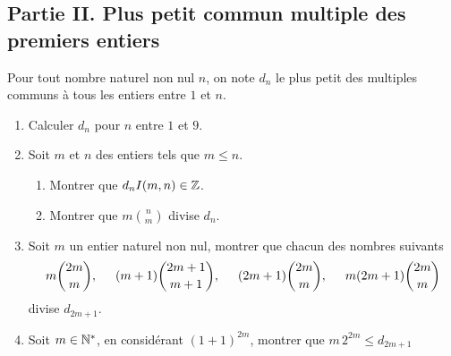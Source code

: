 \subsection*{Partie II. Plus petit commun multiple des premiers entiers}
Pour tout nombre naturel non nul $n$, on note $d_n$ le plus petit des multiples communs à tous les entiers entre $1$ et $n$.
\begin{enumerate}
 \item Calculer $d_n$ pour $n$ entre $1$ et $9$.
 \item Soit $m$ et $n$ des entiers tels que  $m\leq n$.
\begin{enumerate}
 \item Montrer que $d_nI(m,n)\in\mathbb{Z}$.
 \item Montrer que $m\binom{n}{m}$ divise $d_n$.
\end{enumerate}
\item Soit $m$ un entier naturel non nul, montrer que chacun des nombres suivants
\begin{displaymath}
 m\binom{2m}{m},\hspace{0.5cm}(m+1)\binom{2m+1}{m+1},\hspace{0.5cm}
 (2m+1)\binom{2m}{m},\hspace{0.5cm}m(2m+1)\binom{2m}{m}
\end{displaymath}
divise $d_{2m+1}$.
\item Soit $m\in \mathbb{N}^*$, en considérant $(1+1)^{2m}$, montrer que $m\,2^{2m}\leq d_{2m+1}$
\end{enumerate}

